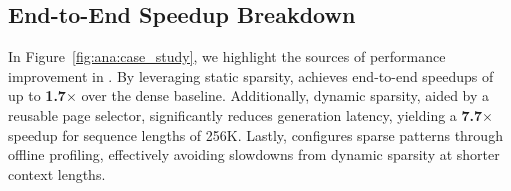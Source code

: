 \subsection{End-to-End Speedup Breakdown}
\label{sect:End-to-End Ablation}



In Figure~\ref{fig:ana:case_study}, we highlight the sources of performance improvement in \system. By leveraging static sparsity, \system achieves end-to-end speedups of up to \textbf{1.7$\times$} over the dense baseline. Additionally, dynamic sparsity, aided by a reusable page selector, significantly reduces generation latency, yielding a \textbf{7.7$\times$} speedup for sequence lengths of 256K. Lastly, \system configures sparse patterns through offline profiling, effectively avoiding slowdowns from dynamic sparsity at shorter context lengths.

























